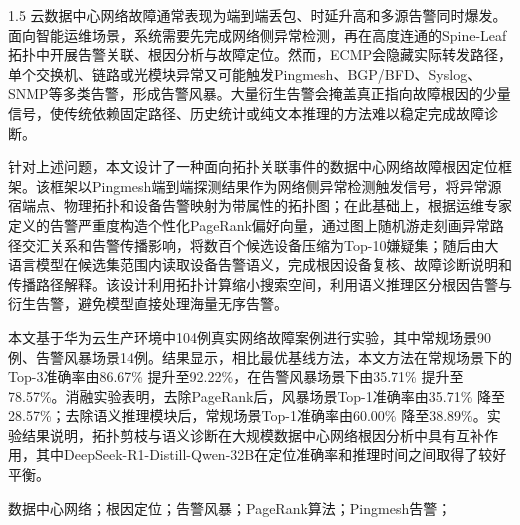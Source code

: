 

\begin{zhaiyao}
\begin{spacing}{1.5}
    云数据中心网络故障通常表现为端到端丢包、时延升高和多源告警同时爆发。面向智能运维场景，系统需要先完成网络侧异常检测，再在高度连通的Spine-Leaf拓扑中开展告警关联、根因分析与故障定位。然而，ECMP会隐藏实际转发路径，单个交换机、链路或光模块异常又可能触发Pingmesh、BGP/BFD、Syslog、SNMP等多类告警，形成告警风暴。大量衍生告警会掩盖真正指向故障根因的少量信号，使传统依赖固定路径、历史统计或纯文本推理的方法难以稳定完成故障诊断。

    针对上述问题，本文设计了一种面向拓扑关联事件的数据中心网络故障根因定位框架。该框架以Pingmesh端到端探测结果作为网络侧异常检测触发信号，将异常源宿端点、物理拓扑和设备告警映射为带属性的拓扑图；在此基础上，根据运维专家定义的告警严重度构造个性化PageRank偏好向量，通过图上随机游走刻画异常路径交汇关系和告警传播影响，将数百个候选设备压缩为Top-10嫌疑集；随后由大语言模型在候选集范围内读取设备告警语义，完成根因设备复核、故障诊断说明和传播路径解释。该设计利用拓扑计算缩小搜索空间，利用语义推理区分根因告警与衍生告警，避免模型直接处理海量无序告警。

    本文基于华为云生产环境中104例真实网络故障案例进行实验，其中常规场景90例、告警风暴场景14例。结果显示，相比最优基线方法，本文方法在常规场景下的Top-3准确率由86.67\% 提升至92.22\%，在告警风暴场景下由35.71\% 提升至78.57\%。消融实验表明，去除PageRank后，风暴场景Top-1准确率由35.71\% 降至28.57\%；去除语义推理模块后，常规场景Top-1准确率由60.00\% 降至38.89\%。实验结果说明，拓扑剪枝与语义诊断在大规模数据中心网络根因分析中具有互补作用，其中DeepSeek-R1-Distill-Qwen-32B在定位准确率和推理时间之间取得了较好平衡。
\end{spacing}
\end{zhaiyao}



\begin{guanjianci}
数据中心网络；根因定位；告警风暴；PageRank算法；Pingmesh告警；
\end{guanjianci}




